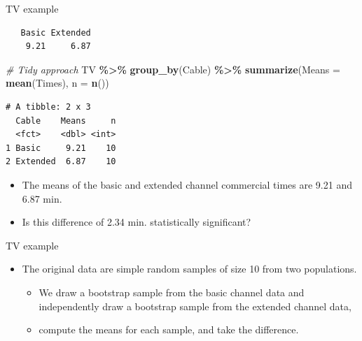 \documentclass[
  ignorenonframetext,
]{beamer}
\newenvironment{Shaded}{\begin{snugshade}}{\end{snugshade}}
\newcommand{\AttributeTok}[1]{\textcolor[rgb]{0.13,0.29,0.53}{#1}}
\newcommand{\CommentTok}[1]{\textcolor[rgb]{0.56,0.35,0.01}{\textit{#1}}}
\newcommand{\FunctionTok}[1]{\textcolor[rgb]{0.13,0.29,0.53}{\textbf{#1}}}
\newcommand{\NormalTok}[1]{#1}
\newcommand{\OtherTok}[1]{\textcolor[rgb]{0.56,0.35,0.01}{#1}}
\newcommand{\SpecialCharTok}[1]{\textcolor[rgb]{0.81,0.36,0.00}{\textbf{#1}}}
\providecommand{\tightlist}{%
  \setlength{\itemsep}{0pt}\setlength{\parskip}{0pt}}
\begin{document}
\begin{frame}[fragile]{TV example}
\label{tv-example-1}
\small

\begin{Shaded}
\end{Shaded}

\begin{verbatim}
   Basic Extended 
    9.21     6.87 
\end{verbatim}

\begin{Shaded}
\begin{Highlighting}[]
\CommentTok{\# Tidy approach}
\NormalTok{TV }\SpecialCharTok{\%\textgreater{}\%}
  \FunctionTok{group\_by}\NormalTok{(Cable) }\SpecialCharTok{\%\textgreater{}\%}
  \FunctionTok{summarize}\NormalTok{(}\AttributeTok{Means =} \FunctionTok{mean}\NormalTok{(Times), }\AttributeTok{n =} \FunctionTok{n}\NormalTok{())}
\end{Highlighting}
\end{Shaded}

\begin{verbatim}
# A tibble: 2 x 3
  Cable    Means     n
  <fct>    <dbl> <int>
1 Basic     9.21    10
2 Extended  6.87    10
\end{verbatim}

\normalsize

\begin{itemize}
\item
  The means of the basic and extended channel commercial times are 9.21
  and 6.87 min.
\item
  Is this difference of 2.34 min. statistically significant?
\end{itemize}
\end{frame}

\begin{frame}{TV example}
\label{tv-example-2}
\begin{itemize}
\item
  The original data are simple random samples of size 10 from two
  populations.

  \begin{itemize}
  \tightlist
  \item
    We draw a bootstrap sample from the basic channel data and
    independently draw a bootstrap sample from the extended channel
    data,
  \item
    compute the means for each sample, and take the difference.
  \end{itemize}
\end{itemize}
\end{frame}
\end{document}
